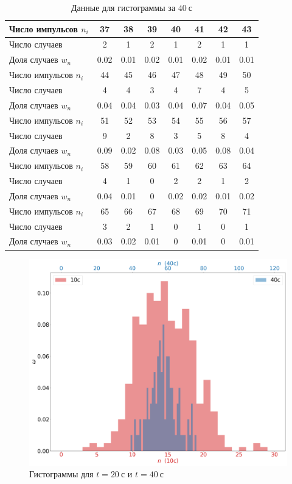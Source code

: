 \documentclass[a4paper, 12pt]{article}
\begin{document}
    \begin{table}[!ht]
    	\centering
    	\begin{tabular}{|l|c|c|c|c|c|c|c|}
    		\hline
    		Число импульсов $n_i$ &  37  &  38  &  39  &  40  &  41  &  42  &  43    \\ \hline
    		Число случаев         &  2   &  1   &  2   &  1   &  2   &  1   &  1     \\ \hline
    		Доля случаев $w_n$    & 0.02 & 0.01 & 0.02 & 0.01 & 0.02 & 0.01 & 0.01   \\ \hline\hline
    		Число импульсов $n_i$ &  44  &  45  &  46  &  47  &  48  &  49  &  50    \\ \hline
    		Число случаев         &  4   &  4   &  3   &  4   &  7   &  4   &  5     \\ \hline
    		Доля случаев $w_n$    & 0.04 & 0.04 & 0.03 & 0.04 & 0.07 & 0.04 & 0.05   \\ \hline\hline
    		Число импульсов $n_i$ &  51  &  52  &  53  &  54  &  55  &  56  &  57    \\ \hline
    		Число случаев         &  9   &  2   &  8   &  3   &  5   &  8   &  4     \\ \hline
    		Доля случаев $w_n$    & 0.09 & 0.02 & 0.08 & 0.03 & 0.05 & 0.08 & 0.04   \\ \hline\hline
    		Число импульсов $n_i$ &  58  &  59  &  60  &  61  &  62  &  63  &  64    \\ \hline
    		Число случаев         &  4   &  1   &  0   &  2   &  2   &  1   &  2     \\ \hline
    		Доля случаев $w_n$    & 0.04 & 0.01 &  0   & 0.02 & 0.02 & 0.01 & 0.02   \\ \hline\hline
    		Число импульсов $n_i$ &  65  &  66  &  67  &  68  &  69  &  70  &  71    \\ \hline
    		Число случаев         &  3   &  2   &  1   &  0   &  1   &  0   &  1     \\ \hline
    		Доля случаев $w_n$    & 0.03 & 0.02 & 0.01 &  0   & 0.01 &  0   & 0.01   \\ \hline
    	\end{tabular}
    	\caption{Данные для гистограммы за $40 \ с$}
    	\label{gist40 }
    \end{table}

    \newpage

    \begin{figure}
        \includegraphics[scale=0.45]{histogram.png}
        \caption{Гистограммы для $t=20 \ с$ и $t=40 \ с$}
    \end{figure}
\end{document}
